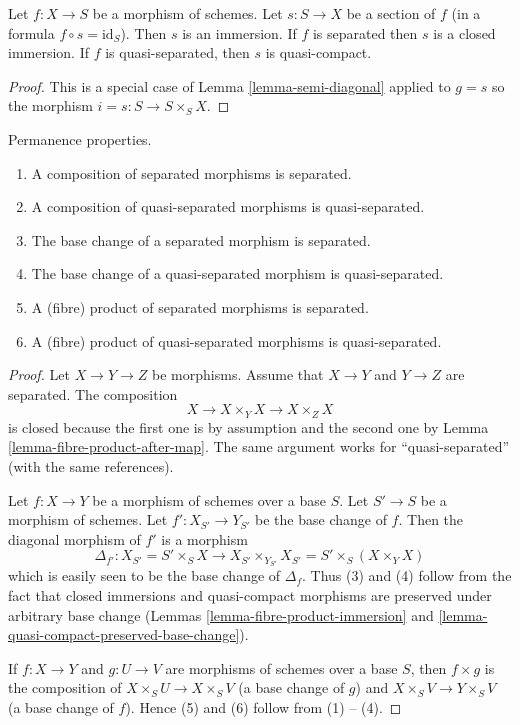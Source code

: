 \begin{lemma}
\label{lemma-section-immersion}
Let $f : X \to S$ be a morphism of schemes.
Let $s : S \to X$ be a section of $f$ (in a formula $f \circ s = \text{id}_S$).
Then $s$ is an immersion.
If $f$ is separated then $s$ is a closed immersion.
If $f$ is quasi-separated, then $s$ is quasi-compact.
\end{lemma}

\begin{proof}
This is a special case of Lemma \ref{lemma-semi-diagonal} applied to
$g =s$ so the morphism $i = s : S \to S \times_S X$.
\end{proof}

\begin{lemma}
\label{lemma-separated-permanence}
Permanence properties.
\begin{enumerate}
\item A composition of separated morphisms is separated.
\item A composition of quasi-separated morphisms is quasi-separated.
\item The base change of a separated morphism is separated.
\item The base change of a quasi-separated morphism is quasi-separated.
\item A (fibre) product of separated morphisms is separated.
\item A (fibre) product of quasi-separated morphisms is quasi-separated.
\end{enumerate}
\end{lemma}

\begin{proof}
Let $X \to Y \to Z$ be morphisms. Assume that $X \to Y$ and
$Y \to Z$ are separated. The composition
$$
X \to X \times_Y X \to X \times_Z X
$$
is closed because the first one is by assumption and the second
one by Lemma \ref{lemma-fibre-product-after-map}. The same argument
works for ``quasi-separated'' (with the same references).

\medskip\noindent
Let $f : X \to Y$ be a morphism of schemes over a base $S$.
Let $S' \to S$ be a morphism of schemes. Let $f' : X_{S'} \to Y_{S'}$
be the base change of $f$. Then the diagonal morphism
of $f'$ is a morphism
$$
\Delta_{f'} :
X_{S'} = S' \times_S X
\longrightarrow
X_{S'} \times_{Y_{S'}} X_{S'} = S' \times _S (X \times_Y X)
$$
which is easily seen to be the base change of $\Delta_f$.
Thus (3) and (4) follow from the fact that
closed immersions and quasi-compact morphisms are preserved
under arbitrary base change (Lemmas
\ref{lemma-fibre-product-immersion} and
\ref{lemma-quasi-compact-preserved-base-change}).

\medskip\noindent
If $f : X \to Y$ and $g : U \to V$ are morphisms of schemes over a base $S$,
then $f \times g$ is the composition of $X \times_S U \to X \times_S V$
(a base change of $g$) and $X \times_S V \to Y \times_S V$ (a base change
of $f$). Hence (5) and (6) follow from (1) -- (4).
\end{proof}

